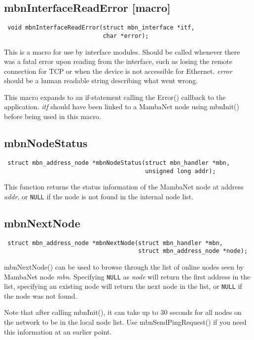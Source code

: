 \subsection{mbnInterfaceReadError \footnotesize{[macro]}}
\begin{verbatim}
 void mbnInterfaceReadError(struct mbn_interface *itf,
                            char *error);
\end{verbatim}
This is a macro for use by interface modules. Should be called whenever there was a fatal error upon reading from the interface, such as losing the remote connection for TCP or when the device is not accessible for Ethernet. \textit{error} should be a human readable string describing what went wrong.

This macro expands to an if-statement calling the Error() callback to the application. \textit{itf} should have been linked to a MambaNet node using mbnInit() before being used in this macro.


\subsection{mbnNodeStatus}
\begin{verbatim}
 struct mbn_address_node *mbnNodeStatus(struct mbn_handler *mbn,
                                        unsigned long addr);
\end{verbatim}
This function returns the status information of the MambaNet node at address \textit{addr}, or \verb|NULL| if the node is not found in the internal node list.


\subsection{mbnNextNode}
\begin{verbatim}
 struct mbn_address_node *mbnNextNode(struct mbn_handler *mbn,
                                      struct mbn_address_node *node);
\end{verbatim}
mbnNextNode() can be used to browse through the list of online nodes seen by MambaNet node \textit{mbn}. Specifying \verb|NULL| as \textit{node} will return the first address in the list, specifying an existing node will return the next node in the list, or \verb|NULL| if the node was not found.

Note that after calling mbnInit(), it can take up to 30 seconds for all nodes on the network to be in the local node list. Use mbnSendPingRequest() if you need this information at an earlier point.


